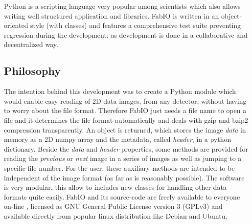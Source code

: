 \documentclass{iucr}
\begin{document}
Python \cite{python} is a scripting language very popular among scientists
which also allows writing well structured application and libraries.
FabIO is written in an object-oriented style (with classes) and features a
comprehensive test suite preventing regression during the development; as
development is done in a collaborative and decentralized way.

\subsection{Philosophy}

The intention behind this development was to create a Python module which would
enable easy reading of 2D data images, from any detector, without having to worry about
the file format.
Therefore FabIO just needs a file name to open a file and it determines the
file format automatically and deals with gzip \cite{gzip} and bzip2
\cite{bzip2} compression transparently.
An object is returned, which stores the image
{\em data} in memory as a 2D numpy array \cite{numpy} and the metadata,
called {\em header}, in a python dictionary. Beside the
{\em data} and {\em header} properties, some methods are provided for reading
the {\em previous} or {\em next} image in a series of images as well as jumping
to a specific file number.
For the user, these auxiliary methods are intended to be independent of
the image format (as far as is reasonably possible).
The software is very modular, this allow to includes new classes for handling 
other data formats quite easily. 
FabIO and its source-code are freely available to everyone on-line \cite{fabio}, 
licensed as GNU General Public License version 3 (GPLv3) and available directly
from popular linux distribution like Debian and Ubuntu.
\end{document}
